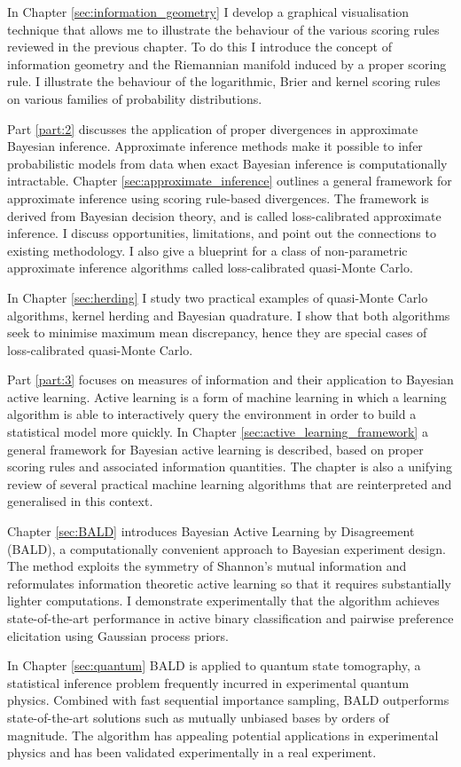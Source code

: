 In Chapter \ref{sec:information_geometry} I develop a graphical visualisation technique that allows me to illustrate the behaviour of the various scoring rules reviewed in the previous chapter. To do this I introduce the concept of information geometry and the Riemannian manifold induced by a proper scoring rule. I illustrate the behaviour of the logarithmic, Brier and kernel scoring rules on various families of probability distributions.

Part \ref{part:2} discusses the application of proper divergences in approximate Bayesian inference. Approximate inference methods make it possible to infer probabilistic models from data when exact Bayesian inference is computationally intractable. Chapter \ref{sec:approximate_inference} outlines a general framework for approximate inference using scoring rule-based divergences. The framework is derived from Bayesian decision theory, and is called loss-calibrated approximate inference. I discuss opportunities, limitations, and point out the connections to existing methodology. I also give a blueprint for a class of non-parametric approximate inference algorithms called loss-calibrated quasi-Monte Carlo.

In Chapter \ref{sec:herding} I study two practical examples of quasi-Monte Carlo algorithms, kernel herding and Bayesian quadrature. I show that both algorithms seek to minimise maximum mean discrepancy, hence they are special cases of loss-calibrated quasi-Monte Carlo. 

Part \ref{part:3} focuses on measures of information and their application to Bayesian active learning. Active learning is a form of machine learning in which a learning algorithm is able to interactively query the environment in order to build a statistical model more quickly. In Chapter \ref{sec:active_learning_framework} a general framework for Bayesian active learning is described, based on proper scoring rules and associated information quantities. The chapter is also a unifying review of several practical machine learning algorithms that are reinterpreted and generalised in this context.

Chapter \ref{sec:BALD} introduces Bayesian Active Learning by Disagreement (BALD), a computationally convenient approach to Bayesian experiment design. The method exploits the symmetry of Shannon's mutual information and reformulates information theoretic active learning so that it requires substantially lighter computations. I demonstrate experimentally that the algorithm achieves state-of-the-art performance in active binary classification and pairwise preference elicitation using Gaussian process priors.

In Chapter \ref{sec:quantum} BALD is applied to quantum state tomography, a statistical inference problem frequently incurred in experimental quantum physics. Combined with fast sequential importance sampling, BALD outperforms state-of-the-art solutions such as mutually unbiased bases by orders of magnitude. The algorithm has appealing potential applications in experimental physics and has been validated experimentally in a real experiment.